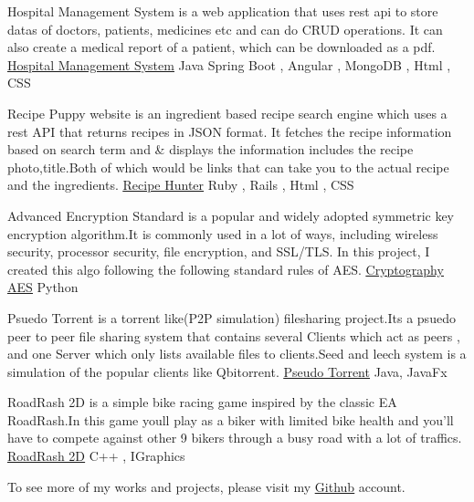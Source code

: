 \documentclass[]{awesome-cv}
\begin{document}
\vspace{-7mm}





\begin{cventries}
	\cventry
	{Hospital Management System is a web application that uses rest api to store datas of doctors, patients, medicines etc and can do CRUD operations. It can also create a medical report of a patient, which can be downloaded as a pdf.}
	{\href{https://github.com/minhaz725/int212b046-Hackathon-Solution}{\underline{Hospital Management System}}}
	{Java Spring Boot , Angular , MongoDB , Html , CSS}
	{}
	{}
	
	\vspace{-5mm}
	\cventry
	{Recipe Puppy website is an ingredient based recipe search engine which uses a rest API that returns recipes in JSON format. It fetches the recipe information based on search term and \& displays the information includes the recipe photo,title.Both of which would be links that can take you to the actual recipe and the ingredients.}
	{\href{https://github.com/minhaz725/Rails\_Project\_recipe\_puppy\_bootstrap}{\underline{Recipe Hunter}}}
	{Ruby , Rails , Html , CSS}
	{}
	{}
	
	
	\vspace{-5mm}
	\cventry
	{Advanced Encryption Standard is a popular and widely adopted symmetric key encryption algorithm.It is commonly used in a lot of ways, including wireless security, processor security, file encryption, and SSL/TLS. In this project, I created this algo following the following standard rules of AES.}
	{\href{https://github.com/minhaz725/Cryptography-AES}{\underline{Cryptography AES}}}
	{Python}
	{}
	{}
	
	
	\vspace{-5mm}
	\cventry
	{Psuedo Torrent is a torrent like(P2P simulation) filesharing project.It\textquotesingle{}s a psuedo peer to peer file sharing system that contains several \textquotedbl{}Clients\textquotedbl{} which act as peers , and one Server which only lists available files to clients.Seed and leech system is a simulation of the popular clients like Qbitorrent.}
	{\href{https://github.com/minhaz725/Pseudo-Torrent}{\underline{Pseudo Torrent}}}
	{Java, JavaFx}
	{}
	{}
	
	\vspace{-5mm}
	\cventry
	{RoadRash 2D is a simple bike racing game inspired by the classic EA RoadRash.In this game you\textquotesingle{}ll play as a biker with limited bike health and you'll have to compete against other 9 bikers through a busy road with a lot of traffics.}
	{\href{https://github.com/minhaz725/RoadRash2D}{\underline{RoadRash 2D}}}
	{C++ , IGraphics}
	{}
	{}
	
	\vspace{-5mm}
	
	\cventry
	{}
	{To see more of my works and projects, please visit my \href{https://github.com/minhaz725}{\underline{Github}} account. }
	{}
	{}
	{}
	
	\vspace{-5mm}
\end{cventries}

\ 
\end{document}
